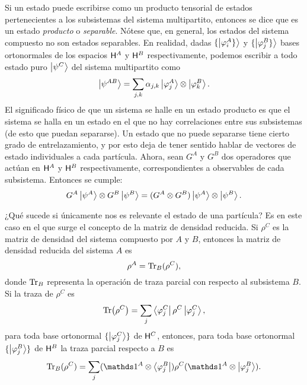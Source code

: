Si un estado puede escribirse como un producto tensorial de estados pertenecientes a los subsistemas del sistema multipartito, entonces se dice que es un estado \textit{producto} o \textit{separable}. Nótese que, en general, los estados del sistema compuesto no son estados separables. En realidad, dadas $\{\ket{\varphi_{i}^{A}\}}$ y $\{\ket{\varphi_{j}^{B}\}}$ bases ortonormales de los espacios ${\sf H}^{A}$ y ${\sf H}^{B}$ respectivamente, podemos escribir a todo estado puro $\ket{\psi^{C}}$ del sistema multipartito como
\begin{equation}
    \ket{\psi^{AB}}=\sum_{j,k}\alpha_{j,k}\ket{\varphi_{j}^{A}}\otimes\ket{\varphi_{k}^{B}}.\nonumber
\end{equation}
El significado físico de que un sistema se halle en un estado producto es que el sistema se halla en un estado en el que no hay correlaciones entre sus subsistemas (de esto que puedan separarse). Un estado que no puede separarse tiene cierto grado de entrelazamiento, y por esto deja de tener sentido hablar de vectores de estado individuales a cada partícula. Ahora, sean $G^{A}$ y $G^{B}$ dos operadores que actúan en ${\sf H}^{A}$ y ${\sf H}^{B}$ respectivamente, correspondientes a observables de cada subsistema. Entonces se cumple:
\begin{equation}
    G^{A}\ket{\psi^{A}}\otimes G^{B}\ket{\psi^{B}}=(G^{A}\otimes G^{B})\ket{\psi^{A}}\otimes\ket{\psi^{B}}.\nonumber
\end{equation}


¿Qué sucede si únicamente nos es relevante el estado de una partícula? Es en este caso en el que surge el concepto de la matriz de densidad reducida. Si $\rho^{C}$ es la matriz de densidad del sistema compuesto por $A$ y $B$, entonces la matriz de densidad reducida del sistema $A$ es
\begin{equation}
    \rho^{A}=\Tr_{B}(\rho^{C}),\nonumber
\end{equation}
donde $\Tr_{B}$ representa la operación de traza parcial con respecto al subsistema $B$. Si la traza de $\rho^{C}$ es 
\begin{equation}
    \Tr(\rho^{C})=\sum_{j}\bra{\varphi^{C}_{j}}\rho^{C}\ket{\varphi^{C}_{j}},\nonumber
\end{equation}
para toda base ortonormal $\{\ket{\varphi^{C}_{j}}\}$ de ${\sf H}^{C}$, entonces, para toda base ortonormal $\{\ket{\varphi^{B}_{j}}\}$ de ${\sf H}^{B}$  la traza parcial respecto a $B$ es \cite{Hardy}
\begin{equation}
    \Tr_{B}(\rho^{C})=\sum_{j}(\Id^{A}\otimes \bra{\varphi^{B}_{j}})\rho^{C}(\Id^{A}\otimes \ket{\varphi^{B}_{j}}).\nonumber
\end{equation}

